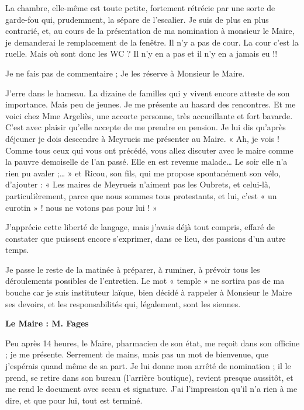 La chambre, elle-même est toute petite, fortement rétrécie par une sorte de garde-fou
qui, prudemment, la sépare de l’escalier.
Je suis de plus en plus contrarié, et, au cours de la présentation de ma nomination à
monsieur le Maire, je demanderai le remplacement de la fenêtre.
Il n’y a pas de cour. La cour c’est la ruelle. Mais où sont donc les WC ? Il n’y en a
pas et il n’y en a jamais eu !!

Je ne fais pas de commentaire ; Je les réserve à Monsieur le Maire.

J’erre dans le hameau. La dizaine de familles qui y vivent encore atteste de son
importance. Mais peu de jeunes. Je me présente au hasard des rencontres. Et me voici
chez Mme Argeliès, une accorte personne, très accueillante et fort bavarde. C’est
avec plaisir qu’elle accepte de me prendre en pension. Je lui dis qu’après déjeuner je
dois descendre à Meyrueis me présenter au Maire.
« Ah, je vois ! Comme tous ceux qui vous ont précédé, vous allez discuter avec le
maire comme la pauvre demoiselle de l’an passé. Elle en est revenue malade… Le
soir elle n’a rien pu avaler ;… »
et Ricou, son fils, qui me propose spontanément son vélo, d’ajouter :
« Les maires de Meyrueis n’aiment pas les Oubrets, et celui-là, particulièrement,
parce que nous sommes tous protestants, et lui, c’est « un curotin » ! nous ne votons
pas pour lui ! »

J’apprécie cette liberté de langage, mais j’avais déjà tout compris, effaré de constater
que puissent encore s’exprimer, dans ce lieu, des passions d’un autre temps.

Je passe le reste de la matinée à préparer, à ruminer, à prévoir tous les déroulements
possibles de l’entretien. Le mot « temple » ne sortira pas de ma bouche car je suis
instituteur laïque, bien décidé à rappeler à Monsieur le Maire ses devoirs, et les
responsabilités qui, légalement, sont les siennes.


\textbf{Le Maire : M. Fages}

Peu après 14 heures, le Maire, pharmacien de son état, me reçoit dans son officine ; je
me présente. Serrement de mains, mais pas un mot de bienvenue, que j’espérais
quand même de sa part. Je lui donne mon arrêté de nomination ; il le prend, se retire
dans son bureau (l’arrière boutique), revient presque aussitôt, et me rend le document
avec sceau et signature. J’ai l’impression qu’il n’a rien à me dire, et que pour lui, tout
est terminé.

